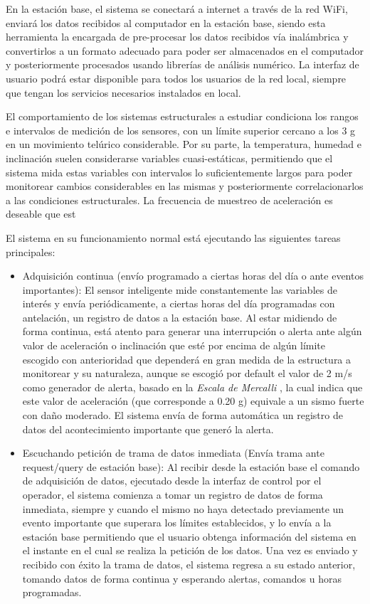 En la estación base, el sistema se conectará a internet a través de la red WiFi, enviará los datos recibidos al computador en la estación base, siendo esta herramienta la encargada de pre-procesar los datos recibidos vía inalámbrica y convertirlos a un formato adecuado para poder ser almacenados en el computador y posteriormente procesados usando librerías de análisis numérico. La interfaz de usuario podrá estar disponible para todos los usuarios de la red local, siempre que tengan los servicios necesarios instalados en local.

El comportamiento de los sistemas estructurales a estudiar condiciona los rangos e intervalos de medición de los sensores, con un límite superior cercano a los 3 g en un movimiento telúrico considerable. Por su parte, la temperatura, humedad e inclinación suelen considerarse variables cuasi-estáticas, permitiendo que el sistema mida estas variables con intervalos lo suficientemente largos para poder monitorear cambios considerables en las mismas y posteriormente correlacionarlos a las condiciones estructurales. La frecuencia de muestreo de aceleración es deseable que est

El sistema en su funcionamiento normal está ejecutando las siguientes tareas principales:

\begin{itemize}
    \item Adquisición continua (envío programado a ciertas horas del día o ante eventos importantes): El sensor inteligente mide constantemente las variables de interés y envía periódicamente, a ciertas horas del día programadas con antelación, un registro de datos a la estación base. Al estar midiendo de forma continua, está atento para generar una interrupción o alerta ante algún valor de aceleración o inclinación que esté por encima de algún límite escogido con anterioridad que dependerá en gran medida de la estructura a monitorear y su naturaleza, aunque se escogió por default el valor de 2 m/s como generador de alerta, basado en la \textit{Escala de Mercalli} \citep{mercalli}, la cual indica que este valor de aceleración (que corresponde a 0.20 g) equivale a un sismo fuerte con daño moderado. El sistema envía de forma automática un registro de datos del acontecimiento importante que generó la alerta.
	\item Escuchando petición de trama de datos inmediata (Envía trama ante request/query de estación base): Al recibir desde la estación base el comando de adquisición de datos, ejecutado desde la interfaz de control por el operador, el sistema comienza a tomar un registro de datos de forma inmediata, siempre y cuando el mismo no haya detectado previamente un evento importante que superara los límites establecidos, y lo envía a la estación base permitiendo que el usuario obtenga información del sistema en el instante en el cual se realiza la petición de los datos. Una vez es enviado y recibido con éxito la trama de datos, el sistema regresa a su estado anterior, tomando datos de forma continua y esperando alertas, comandos u horas programadas.

\end{itemize}

